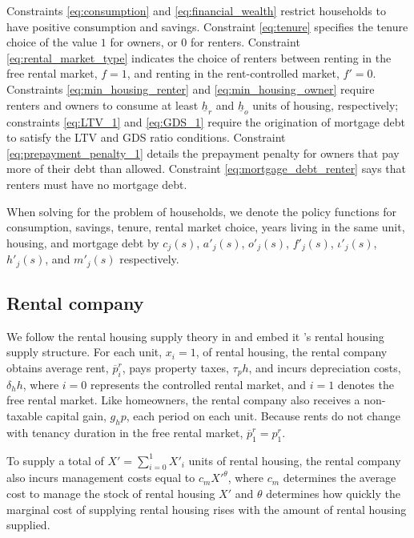 \documentclass[parskip=full]{article}
\begin{document}
Constraints \ref{eq:consumption} and \ref{eq:financial_wealth} restrict households to have positive consumption and savings. Constraint \ref{eq:tenure} specifies the tenure choice of the value $1$ for owners, or $0$ for renters. Constraint \ref{eq:rental_market_type} indicates the choice of renters between renting in the free rental market, $f=1$, and renting in the rent-controlled market, $f'=0$. Constraints \ref{eq:min_housing_renter} and \ref{eq:min_housing_owner} require renters and owners to consume at least $\underline{h}_{r}$ and $\underline{h}_{o}$ units of housing, respectively; constraints \ref{eq:LTV_1} and \ref{eq:GDS_1} require the origination of mortgage debt to satisfy the LTV and GDS ratio conditions. Constraint \ref{eq:prepayment_penalty_1} details the prepayment penalty for owners that pay more of their debt than allowed. Constraint \ref{eq:mortgage_debt_renter} says that renters must have no mortgage debt. 

When solving for the problem of households, we denote the policy functions for consumption, savings, tenure, rental market choice, years living in the same unit, housing, and mortgage debt by $c_{j}(s)$, $a'_{j}(s)$, $o'_{j}(s)$, $f'_{j}(s)$, $\iota'_{j}(s)$, $h'_{j}(s)$, and $m'_{j}(s)$ respectively.

\subsection{Rental company}

We follow the rental housing supply theory in \citet{fallis-1985} and embed it \citet{garrigaeetal-2009}'s rental housing supply structure. For each unit, $x_{i}=1$, of rental housing, the rental company obtains average rent, $\overline{p}^{r}_{i}$, pays property taxes, $\tau_{p}h$, and incurs depreciation costs, $\delta_{h}h$, where $i=0$ represents the controlled rental market, and $i=1$ denotes the free rental market. Like homeowners, the rental company also receives a non-taxable capital gain, $g_{h}p$, each period on each unit. Because rents do not change with tenancy duration in the free rental market, $\overline{p}^{r}_{1}=p^{r}_{1}$. 

To supply a total of $X'=\sum^{1}_{i=0} X'_{i}$ units of rental housing, the rental company also incurs management costs equal to $c_{m}X'^{\theta}$, where $c_{m}$ determines the average cost to manage the stock of rental housing $X'$ and $\theta$ determines how quickly the marginal cost of supplying rental housing rises with the amount of rental housing supplied. 
\end{document}
